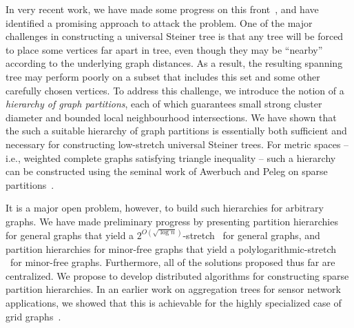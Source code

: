 In very recent work, we have made some progress on this
front~\cite{busch+drrs:ust}, and have identified a promising approach
to attack the problem.  One of the major challenges in constructing a
universal Steiner tree is that any tree will be forced to place some
vertices far apart in tree, even though they may be ``nearby''
according to the underlying graph distances.  As a result, the
resulting spanning tree may perform poorly on a subset that includes
this set and some other carefully chosen vertices.  To address this
challenge, we introduce the notion of a {\em hierarchy of graph
  partitions}, each of which guarantees small strong cluster diameter
and bounded local neighbourhood intersections.  We have shown that the
such a suitable hierarchy of graph partitions is essentially both
sufficient and necessary for constructing low-stretch universal
Steiner trees.  For metric spaces -- i.e., weighted complete graphs
satisfying triangle inequality -- such a hierarchy can be constructed
using the seminal work of Awerbuch and Peleg on sparse
partitions~\cite{awerbuch+p:partition,peleg:distributeBook}.

It is a major open problem, however, to build such hierarchies for
arbitrary graphs.  We have made preliminary progress by presenting
partition hierarchies for general graphs that yield a $2^{O(\sqrt{\log
    n})}$-stretch \ust\ for general graphs, and partition hierarchies
for minor-free graphs that yield a polylogarithmic-stretch \ust\ for
minor-free graphs.  Furthermore, all of the solutions proposed thus
far are centralized.  We propose to develop distributed algorithms for
constructing sparse partition hierarchies.  In an earlier work on
aggregation trees for sensor network applications, we showed that this
is achievable for the highly specialized case of grid
graphs~\cite{jia+nrs:gist}.

